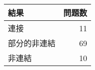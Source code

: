 \begin{tabular}{l|r} \hline
  結果 & 問題数 \\ \hline
  連接 & 11 \\ \hline
  部分的非連結 & 69 \\ \hline
  非連結 & 10 \\ \hline
\end{tabular}